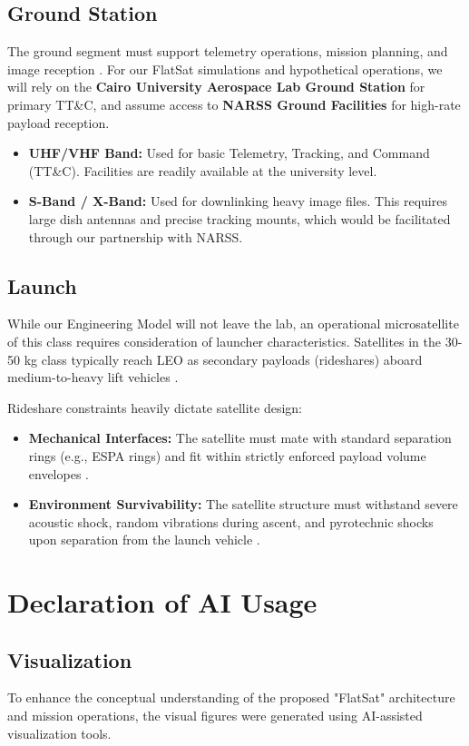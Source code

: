 ﻿\documentclass[12pt,a4paper]{report}
\begin{document}
\section{Ground Station}
The ground segment must support telemetry operations, mission planning, and image reception \cite{smad3}. For our FlatSat simulations and hypothetical operations, we will rely on the \textbf{Cairo University Aerospace Lab Ground Station} for primary TT\&C, and assume access to \textbf{NARSS Ground Facilities} for high-rate payload reception. 
\begin{itemize}
    \item \textbf{UHF/VHF Band:} Used for basic Telemetry, Tracking, and Command (TT\&C). Facilities are readily available at the university level.
    \item \textbf{S-Band / X-Band:} Used for downlinking heavy image files. This requires large dish antennas and precise tracking mounts, which would be facilitated through our partnership with NARSS.
\end{itemize}

\section{Launch}
While our Engineering Model will not leave the lab, an operational microsatellite of this class requires consideration of launcher characteristics. Satellites in the 30-50 kg class typically reach LEO as secondary payloads (rideshares) aboard medium-to-heavy lift vehicles \cite{smad3}. 

Rideshare constraints heavily dictate satellite design:
\begin{itemize}
    \item \textbf{Mechanical Interfaces:} The satellite must mate with standard separation rings (e.g., ESPA rings) and fit within strictly enforced payload volume envelopes \cite{smad3}.
    \item \textbf{Environment Survivability:} The satellite structure must withstand severe acoustic shock, random vibrations during ascent, and pyrotechnic shocks upon separation from the launch vehicle \cite{smad3}.
\end{itemize}
\FloatBarrier
\FloatBarrier
\chapter*{Declaration of AI Usage}
\section*{Visualization}
To enhance the conceptual understanding of the proposed "FlatSat" architecture and mission operations, the visual figures were generated using AI-assisted visualization tools.
\end{document}
